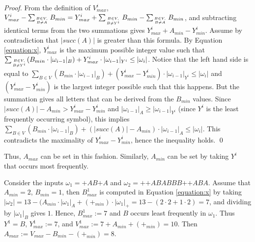 \documentclass{llncs}
\begin{document}
	\begin{proof}	
		From the definition of $V^{i}_{max}$, $V^{i}_{max}  - \sum_{B \in V, \atop B \neq A} B_{min} = Y^{i}_{max} + \sum_{B \in V, \atop B \neq Y^{i}} B_{min} - \sum_{B \in V, \atop B \neq A} B_{min}$, and subtracting identical terms from the two summations gives $Y^{i}_{max} + A_{min} - Y^{i}_{min}$. Assume by contradiction that $|succ(A)|$ is greater than this formula. By Equation \ref{equation:x}, $Y^{i}_{max}$ is the maximum possible integer value such that $\sum_{B \in V, \atop B \neq Y^{i}} (B_{min} \cdot |\omega_{i-1}|_{B}) + Y^{i}_{max} \cdot |\omega_{i-1}|_{Y^{i}} \leq |\omega_{i}|$. Notice that the left hand side is equal to $\sum_{B \in V} (B_{min} \cdot |\omega_{i-1}|_{B}) + (Y^{i}_{max} - Y^{i}_{min}) \cdot |\omega_{i-1}|_{Y^{i}} \leq |\omega_{i}|$ and $(Y^{i}_{max} - Y^{i}_{min})$ is the largest integer possible such that this happens. But the summation gives all letters that can be derived from the $B_{min}$ values. Since $|succ(A)| - A_{min} > Y^{i}_{max} - Y^{i}_{min}$ and $|\omega_{i-1}|_{A} \geq |\omega_{i-1}|_{Y^{i}}$ (since $Y^{i}$ is the least frequently occurring symbol), this implies $\sum_{B \in V} (B_{min} \cdot |\omega_{i-1}|_{B}) + (|succ(A)| - A_{min}) \cdot |\omega_{i-1}|_{A} \leq |\omega_{i}|$. This contradicts the maximality of $Y^{i}_{max} - Y^{i}_{min}$, hence the inequality holds.
		\qed
	\end{proof}
	
	
	Thus, $A_{max}$ can be set in this fashion. Similarly, $A_{min}$ can be set by taking $Y^{i}$ that occurs most frequently.
	
	\begin{example}
		Consider the inputs $\omega_{1} = \text{+}AB\text{+}A$ and $\omega_{2} = \text{+}\text{+}ABABBB\text{+}\text{+}ABA$. Assume that $A_{min} = 2$, $B_{min} = 1$, then $B^{1}_{max}$ is computed in Equation \ref{equation:x} by taking $|\omega_{2}| = 13 - (A_{min} \cdot |\omega_{1}|_{A} + (\text{+}_{min}) \cdot |\omega_{1}|_{+} = 13 - (2 \cdot 2 + 1 \cdot 2) = 7$, and dividing by $|\omega_{1}|_{B}$ gives $1$. Hence, $B^{1}_{max} := 7$ and $B$ occurs least frequently in $\omega_{1}$. Thus $Y^{1} = B$, $Y^{1}_{max} := 7$, and $V^{1}_{max} := 7 + A_{min} + (\text{+}_{min}) = 10$. Then $A_{max} := V_{max} - B_{min} - (\text{+}_{min}) = 8$.
		\label{example:2}
	\end{example}
	
	
\end{document}
